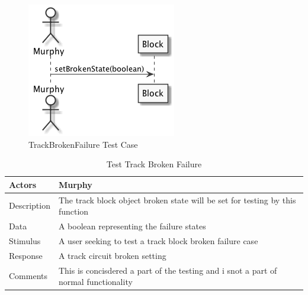 \documentclass[]{article}
\begin{document}
\begin{figure}[H]
	\centering
	\includegraphics[scale=.5]{setBroken.png}
	\caption{TrackBrokenFailure Test Case}
\end{figure}
\begin{table}[H]
	\centering
	\caption{Test Track Broken Failure}
	\begin{tabular}{|l|l|}
		\hline
		Actors & \parbox[t]{10cm}{Murphy} \\ \hline
		Description & \parbox[t]{10cm}{The track block object broken state will be set for testing by this function} \\ \hline
		Data &  \parbox[t]{10cm}{A boolean representing the failure states} \\ \hline
		Stimulus &  \parbox[t]{10cm}{A user seeking to test a track block broken failure case} \\ \hline
		Response & \parbox[t]{10cm}{A track circuit broken setting}\\ \hline
		Comments & \parbox[t]{10cm}{This is concisdered a part of the testing and i snot a part of normal functionality}  \\ \hline
	\end{tabular}
\end{table}
\end{document}
